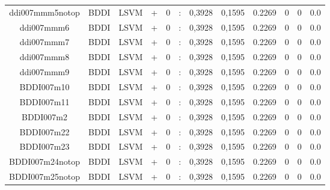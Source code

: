 \documentclass[a4paper]{article}
\begin{document}
\begin{landscape}
\begin{center}
\begin{tabular}{ |c|c|c|c|c|c|c|c|c|c|c|c|}
 
 	
 	\small{ ddi007mmm5notop } & BDDI & LSVM & +  &  0 &  :  &  0,3928 & 0,1595 & 0.2269  &  0 & 0 & 0.0 \\
 	

 
 	
 	\small{ ddi007mmm6 } & BDDI & LSVM & +  &  0 &  :  &  0,3928 & 0,1595 & 0.2269  &  0 & 0 & 0.0 \\
 	

 
 	
 	\small{ ddi007mmm7 } & BDDI & LSVM & +  &  0 &  :  &  0,3928 & 0,1595 & 0.2269  &  0 & 0 & 0.0 \\
 	

 
 	
 	\small{ ddi007mmm8 } & BDDI & LSVM & +  &  0 &  :  &  0,3928 & 0,1595 & 0.2269  &  0 & 0 & 0.0 \\
 	

 
 	
 	\small{ ddi007mmm9 } & BDDI & LSVM & +  &  0 &  :  &  0,3928 & 0,1595 & 0.2269  &  0 & 0 & 0.0 \\
 	

 
 	
 	\small{ BDDI007m10 } & BDDI & LSVM & +  &  0 &  :  &  0,3928 & 0,1595 & 0.2269  &  0 & 0 & 0.0 \\
 	

 
 	
 	\small{ BDDI007m11 } & BDDI & LSVM & +  &  0 &  :  &  0,3928 & 0,1595 & 0.2269  &  0 & 0 & 0.0 \\
 	

 
 	
 	\small{ BDDI007m2 } & BDDI & LSVM & +  &  0 &  :  &  0,3928 & 0,1595 & 0.2269  &  0 & 0 & 0.0 \\
 	

 
 	
 	\small{ BDDI007m22 } & BDDI & LSVM & +  &  0 &  :  &  0,3928 & 0,1595 & 0.2269  &  0 & 0 & 0.0 \\
 	

 
 	
 	\small{ BDDI007m23 } & BDDI & LSVM & +  &  0 &  :  &  0,3928 & 0,1595 & 0.2269  &  0 & 0 & 0.0 \\
 	

 
 	
 	\small{ BDDI007m24notop } & BDDI & LSVM & +  &  0 &  :  &  0,3928 & 0,1595 & 0.2269  &  0 & 0 & 0.0 \\
 	

 
 	
 	\small{ BDDI007m25notop } & BDDI & LSVM & +  &  0 &  :  &  0,3928 & 0,1595 & 0.2269  &  0 & 0 & 0.0 \\
 	


\end{tabular}
\end{center}
\end{landscape}
\end{document}
